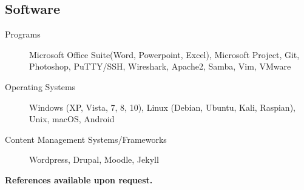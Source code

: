 \documentclass{article}
\begin{document}
\begin{samepage}
\subsection{Software}

\begin{description}
\item[Programs] Microsoft Office Suite(Word, Powerpoint, Excel), Microsoft Project, Git, Photoshop, PuTTY/SSH, Wireshark, Apache2, Samba, Vim, VMware
\item[Operating Systems] Windows (XP, Vista, 7, 8, 10), Linux (Debian, Ubuntu, Kali, Raspian), Unix,  macOS, Android 
\item[Content Management Systems/Frameworks] Wordpress, Drupal, Moodle, Jekyll
\end{description}



\begin{center}
\textbf{References available upon request.}
\end{center}

\end{samepage}
\end{document}
